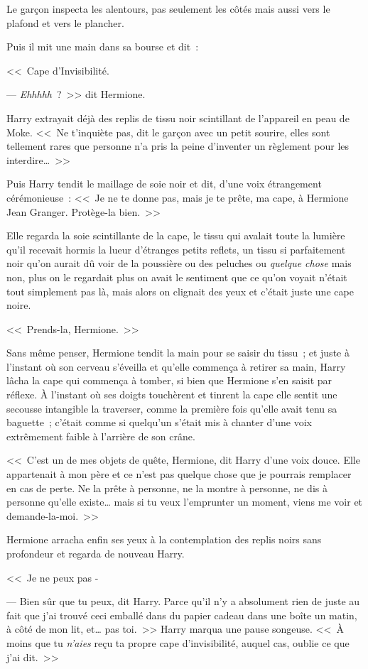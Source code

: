 Le garçon inspecta les alentours, pas seulement les côtés mais aussi vers le plafond et vers le plancher.

Puis il mit une main dans sa bourse et dit~:

<<~Cape d'Invisibilité.

--- \emph{Ehhhhh}~?~>> dit Hermione.

Harry extrayait déjà des replis de tissu noir scintillant de l'appareil en peau de Moke. <<~Ne t'inquiète pas, dit le garçon avec un petit sourire, elles sont tellement rares que personne n'a pris la peine d'inventer un règlement pour les interdire…~>>

Puis Harry tendit le maillage de soie noir et dit, d'une voix étrangement cérémonieuse~: <<~Je ne te donne pas, mais je te prête, ma cape, à Hermione Jean Granger. Protège-la bien.~>>

Elle regarda la soie scintillante de la cape, le tissu qui avalait toute la lumière qu'il recevait hormis la lueur d'étranges petits reflets, un tissu si parfaitement noir qu'on aurait dû voir de la poussière ou des peluches ou \emph{quelque chose} mais non, plus on le regardait plus on avait le sentiment que ce qu'on voyait n'était tout simplement pas là, mais alors on clignait des yeux et c'était juste une cape noire.

<<~Prends-la, Hermione.~>>

Sans même penser, Hermione tendit la main pour se saisir du tissu~; et juste à l'instant où son cerveau s'éveilla et qu'elle commença à retirer sa main, Harry lâcha la cape qui commença à tomber, si bien que Hermione s'en saisit par réflexe. À l'instant où ses doigts touchèrent et tinrent la cape elle sentit une secousse intangible la traverser, comme la première fois qu'elle avait tenu sa baguette~; c'était comme si quelqu'un s'était mis à chanter d'une voix extrêmement faible à l'arrière de son crâne.

<<~C'est un de mes objets de quête, Hermione, dit Harry d'une voix douce. Elle appartenait à mon père et ce n'est pas quelque chose que je pourrais remplacer en cas de perte. Ne la prête à personne, ne la montre à personne, ne dis à personne qu'elle existe… mais si tu veux l'emprunter un moment, viens me voir et demande-la-moi.~>>

Hermione arracha enfin ses yeux à la contemplation des replis noirs sans profondeur et regarda de nouveau Harry.

<<~Je ne peux pas -

--- Bien sûr que tu peux, dit Harry. Parce qu'il n'y a absolument rien de juste au fait que j'ai trouvé ceci emballé dans du papier cadeau dans une boîte un matin, à côté de mon lit, et… pas toi.~>> Harry marqua une pause songeuse. <<~À moins que tu \emph{n'aies} reçu ta propre cape d'invisibilité, auquel cas, oublie ce que j'ai dit.~>>

